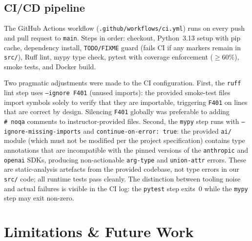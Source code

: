 \documentclass[11pt,a4paper]{article}
\begin{document}
\subsection{CI/CD pipeline}

The GitHub Actions workflow (\texttt{.github/workflows/ci.yml}) runs on every push and
pull request to \texttt{main}. Steps in order: checkout, Python~3.13 setup with pip
cache, dependency install, \texttt{TODO/FIXME} guard (fails CI if any markers remain in
\texttt{src/}), Ruff lint, mypy type check, pytest with coverage enforcement
($\geq$60\%), smoke tests, and Docker build.

Two pragmatic adjustments were made to the CI configuration.
First, the \texttt{ruff} lint step uses \texttt{--ignore~F401} (unused imports):
the provided smoke-test files import symbols solely to verify that they are
importable, triggering \texttt{F401} on lines that are correct by design.
Silencing \texttt{F401} globally was preferable to adding
\texttt{\#~noqa} comments to instructor-provided files.
Second, the \texttt{mypy} step runs with \texttt{--ignore-missing-imports}
and \texttt{continue-on-error:~true}: the provided \texttt{ai/} module
(which must not be modified per the project specification) contains type
annotations that are incompatible with the pinned versions of the
\texttt{anthropic} and \texttt{openai} SDKs, producing non-actionable
\texttt{arg-type} and \texttt{union-attr} errors.
These are static-analysis artefacts from the provided codebase, not type
errors in our \texttt{src/} code; all runtime tests pass cleanly.
The distinction between tooling noise and actual failures is visible in
the CI log: the \texttt{pytest} step exits~0 while the \texttt{mypy}
step may exit non-zero.

\section{Limitations \& Future Work}\label{sec:limits}
\end{document}
